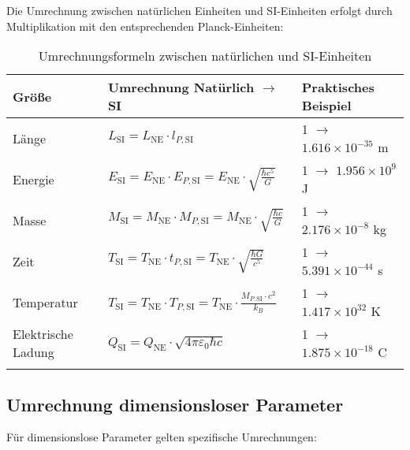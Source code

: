 \documentclass[12pt,a4paper]{article}
\begin{document}
	Die Umrechnung zwischen natürlichen Einheiten und SI-Einheiten erfolgt durch Multiplikation mit den entsprechenden Planck-Einheiten:
	
	\begin{table}[ht]
		\centering
		\begin{adjustbox}{scale=1}
			\begin{tabular}{lll}
				\hline
				\textbf{Größe} & \textbf{Umrechnung Natürlich $\to$ SI} & \textbf{Praktisches Beispiel} \\
				\hline
				Länge & $L_{\text{SI}} = L_{\text{NE}} \cdot l_{P,\text{SI}}$ & 1 $\to$ $1.616 \times 10^{-35}$ m \\
				Energie & $E_{\text{SI}} = E_{\text{NE}} \cdot E_{P,\text{SI}} = E_{\text{NE}} \cdot \sqrt{\frac{\hbar c^5}{G}}$ & 1 $\to$ $1.956 \times 10^9$ J \\
				Masse & $M_{\text{SI}} = M_{\text{NE}} \cdot M_{P,\text{SI}} = M_{\text{NE}} \cdot \sqrt{\frac{\hbar c}{G}}$ & 1 $\to$ $2.176 \times 10^{-8}$ kg \\
				Zeit & $T_{\text{SI}} = T_{\text{NE}} \cdot t_{P,\text{SI}} = T_{\text{NE}} \cdot \sqrt{\frac{\hbar G}{c^5}}$ & 1 $\to$ $5.391 \times 10^{-44}$ s \\
				Temperatur & $T_{\text{SI}} = T_{\text{NE}} \cdot T_{P,\text{SI}} = T_{\text{NE}} \cdot \frac{M_{P,\text{SI}}\cdot c^2}{k_B}$ & 1 $\to$ $1.417 \times 10^{32}$ K \\
				Elektrische Ladung & $Q_{\text{SI}} = Q_{\text{NE}} \cdot \sqrt{4\pi\varepsilon_0\hbar c}$ & 1 $\to$ $1.875 \times 10^{-18}$ C \\
				\hline
				\multicolumn{2}{c}{} \\
				\hline
			\end{tabular}
		\end{adjustbox}
		\caption{Umrechnungsformeln zwischen natürlichen und SI-Einheiten}
		\label{tab:conversion}
	\end{table}
	
	\subsection{Umrechnung dimensionsloser Parameter}
	
	Für dimensionslose Parameter gelten spezifische Umrechnungen:
	
\end{document}
